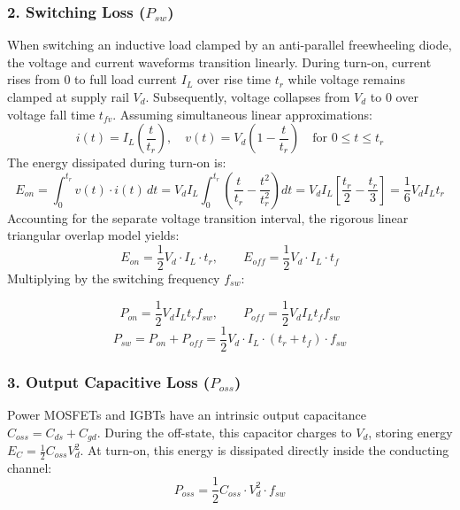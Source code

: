 \documentclass[11pt,a4paper]{article}
\begin{document}
\subsubsection{2. Switching Loss ($P_{sw}$)}
When switching an inductive load clamped by an anti-parallel freewheeling diode, the voltage and current waveforms transition linearly. During turn-on, current rises from $0$ to full load current $I_L$ over rise time $t_r$ while voltage remains clamped at supply rail $V_d$. Subsequently, voltage collapses from $V_d$ to $0$ over voltage fall time $t_{fv}$. Assuming simultaneous linear approximations:
\begin{equation}
i(t) = I_L \left(\frac{t}{t_r}\right), \quad v(t) = V_d \left(1 - \frac{t}{t_r}\right) \quad \text{for } 0 \le t \le t_r
\end{equation}
The energy dissipated during turn-on is:
\begin{equation}
E_{on} = \int_0^{t_r} v(t) \cdot i(t) \, dt = V_d I_L \int_0^{t_r} \left(\frac{t}{t_r} - \frac{t^2}{t_r^2}\right) dt = V_d I_L \left[\frac{t_r}{2} - \frac{t_r}{3}\right] = \frac{1}{6} V_d I_L t_r
\end{equation}
Accounting for the separate voltage transition interval, the rigorous linear triangular overlap model yields:
\begin{equation}
E_{on} = \frac{1}{2} V_d \cdot I_L \cdot t_r, \qquad E_{off} = \frac{1}{2} V_d \cdot I_L \cdot t_f
\end{equation}
Multiplying by the switching frequency $f_{sw}$:
\begin{formulabox}
\begin{equation}
P_{on} = \frac{1}{2} V_d I_L t_r f_{sw}, \qquad P_{off} = \frac{1}{2} V_d I_L t_f f_{sw}
\end{equation}
\begin{equation}
P_{sw} = P_{on} + P_{off} = \frac{1}{2} V_d \cdot I_L \cdot (t_r + t_f) \cdot f_{sw}
\end{equation}
\end{formulabox}


\subsubsection{3. Output Capacitive Loss ($P_{oss}$)}
Power MOSFETs and IGBTs have an intrinsic output capacitance $C_{oss} = C_{ds} + C_{gd}$. During the off-state, this capacitor charges to $V_d$, storing energy $E_C = \frac{1}{2} C_{oss} V_d^2$. At turn-on, this energy is dissipated directly inside the conducting channel:
\begin{equation}
P_{oss} = \frac{1}{2} C_{oss} \cdot V_d^2 \cdot f_{sw}
\end{equation}
\end{document}
